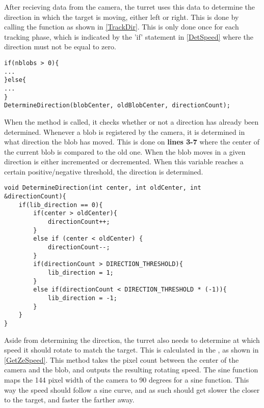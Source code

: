 After recieving data from the camera, the turret uses this data to determine the
direction in which the target is moving, either left or right. This is done by
calling the  function as shown in
\autoref{TrackDir}. This is only done once for each tracking phase, which is
indicated by the 'if' statement in \autoref{DetSpeed} where the direction
must not be equal to zero.\nl

\begin{minipage}[H]{\linewidth}
\begin{lstlisting}[caption = Call DetermineDirection., label = TrackDir]
if(nblobs > 0){
...
}else{
...
}
DetermineDirection(blobCenter, oldBlobCenter, directionCount);
\end{lstlisting}
\end{minipage}

When the  method is called, it checks
whether or not a direction has already been determined. Whenever a blob is
registered by the camera, it is determined in what direction the blob has
moved. This is done on \textbf{lines 3-7} where the center of the
current blob is compared to the old one. When the blob moves in a given
direction  is either incremented or decremented.
When this variable reaches a certain positive/negative threshold, the direction
is determined.\nl

\begin{minipage}[H]{\linewidth}
\begin{lstlisting}[caption = Determine the targets direction., label = DeterDir]
void DetermineDirection(int center, int oldCenter, int &directionCount){
	if(lib_direction == 0){
		if(center > oldCenter){
    		directionCount++;
		}
    	else if (center < oldCenter) {
    		directionCount--;
   		}
    	if(directionCount > DIRECTION_THRESHOLD){
    		lib_direction = 1;
    	}
    	else if(directionCount < DIRECTION_THRESHOLD * (-1)){
    		lib_direction = -1;
    	}
    }
}
\end{lstlisting}
\end{minipage}

Aside from determining the direction, the turret also needs to determine at
which speed it should rotate to match the target. This is calculated in the
, as shown in \autoref{GetZeSpeed}. This method
takes the pixel count between the center of the camera and the blob, and outputs
the resulting rotating speed. The sine function maps the 144 pixel width of the
camera to 90 degrees for a sine function. This way the speed should follow a
sine curve, and as such should get slower the closer to the target, and faster
the farther away.\nl

